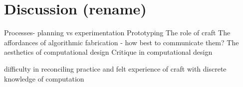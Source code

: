 \chapter{Discussion (rename)}

	Processes- planning vs experimentation
	Prototyping
	The role of craft
	The affordances of algorithmic fabrication - how best to communicate them?
	The aesthetics of computational design
	Critique in computational design
	
	difficulty in reconciling practice and felt experience of craft with discrete knowledge of computation
	
	

